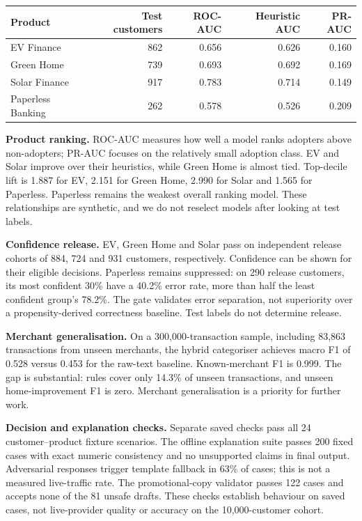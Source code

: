 \documentclass[10pt,a4paper]{article}
\begin{document}
\begin{center}
\setlength{\tabcolsep}{9pt}
\begin{tabular}{lrrrr}
\toprule
Product & Test customers & ROC-AUC & Heuristic AUC & PR-AUC \\
\midrule
EV Finance & 862 & 0.656 & 0.626 & 0.160 \\
Green Home & 739 & 0.693 & 0.692 & 0.169 \\
Solar Finance & 917 & 0.783 & 0.714 & 0.149 \\
Paperless Banking & 262 & 0.578 & 0.526 & 0.209 \\
\bottomrule
\end{tabular}
\end{center}

\textbf{Product ranking.} ROC-AUC measures how well a model ranks adopters above non-adopters; PR-AUC focuses on the relatively small adoption class. EV and Solar improve over their heuristics, while Green Home is almost tied. Top-decile lift is 1.887 for EV, 2.151 for Green Home, 2.990 for Solar and 1.565 for Paperless. Paperless remains the weakest overall ranking model. These relationships are synthetic, and we do not reselect models after looking at test labels.

\textbf{Confidence release.} EV, Green Home and Solar pass on independent release cohorts of 884, 724 and 931 customers, respectively. Confidence can be shown for their eligible decisions. Paperless remains suppressed: on 290 release customers, its most confident 30\% have a 40.2\% error rate, more than half the least confident group's 78.2\%. The gate validates error separation, not superiority over a propensity-derived correctness baseline. Test labels do not determine release.

\textbf{Merchant generalisation.} On a 300,000-transaction sample, including 83,863 transactions from unseen merchants, the hybrid categoriser achieves macro F1 of 0.528 versus 0.453 for the raw-text baseline. Known-merchant F1 is 0.999. The gap is substantial: rules cover only 14.3\% of unseen transactions, and unseen home-improvement F1 is zero. Merchant generalisation is a priority for further work.

\textbf{Decision and explanation checks.} Separate saved checks pass all 24 customer--product fixture scenarios. The offline explanation suite passes 200 fixed cases with exact numeric consistency and no unsupported claims in final output. Adversarial responses trigger template fallback in 63\% of cases; this is not a measured live-traffic rate. The promotional-copy validator passes 122 cases and accepts none of the 81 unsafe drafts. These checks establish behaviour on saved cases, not live-provider quality or accuracy on the 10,000-customer cohort.
\end{document}
